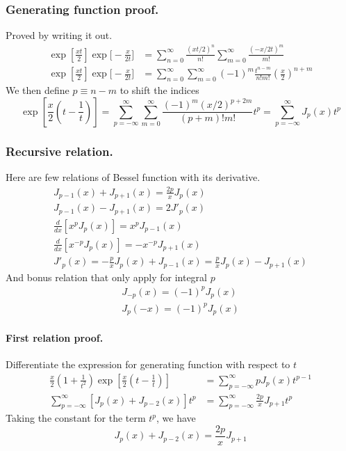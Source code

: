 \documentclass[../../../main.tex]{subfiles}
\begin{document}
\subsubsection{Generating function proof.} Proved by writing it out.
\begin{align*}
    \exp\left[\frac{xt}{2}\right] \exp\bigg[-\frac{x}{2t}\bigg] & =\sum_{n=0}^{\infty}\frac{(xt/2)^n}{n!}\sum_{m=0}^{\infty} \frac{(-x/2t)^m}{m!}                 \\
    \exp\left[\frac{xt}{2}\right] \exp\bigg[-\frac{x}{2t}\bigg] & =\sum_{n=0}^{\infty}\sum_{m=0}^{\infty}(-1)^m\frac{t^{n-m}}{n!m!}\left(\frac{x}{2}\right)^{n+m}
\end{align*}
We then define $p\equiv n-m$ to shift the indices
\begin{equation*}
    \exp\left[\frac{x}{2}\left(t-\frac{1}{t}\right)\right]= \sum_{p=-\infty}^{\infty}\sum_{m=0}^{\infty}\frac{(-1)^m(x/2)^{p+2m}}{(p+m)!m!}t^p=\sum_{p=-\infty}^{\infty}J_p(x)t^p
\end{equation*}

\subsubsection{Recursive relation.} Here are few relations of Bessel function with its derivative.
\begin{gather*}
    J_{p-1}(x)+J_{p+1}(x)=\frac{2p}{x}J_p(x)\\
    J_{p-1}(x)- J_{p+1}(x)=2J'_p(x)\\
    \frac{d}{dx}[x^pJ_p(x)]=x^pJ_{p-1}(x)\\
    \frac{d}{dx}[x^{-p}J_p(x)]=-x^{-p}J_{p+1}(x)\\
    J'_p(x)=-\frac{p}{x}J_p(x)+J_{p-1}(x)=\frac{p}{x}J_p(x)-J_{p+1}(x)
\end{gather*}
And bonus relation that only apply for integral $p$
\begin{gather*}
    J_{-p}(x)=(-1)^pJ_p(x)\\
    J_p(-x)=(-1)^pJ_p(x)
\end{gather*}


\paragraph*{First relation proof.} Differentiate the expression for generating function with respect to $t$
\begin{align*}
    \frac{x}{2}\left(1+\frac{1}{t^2}\right)\exp\left[\frac{x}{2}\left(t-\frac{1}{t}\right)\right] & =\sum_{p=-\infty}^{\infty}pJ_p(x)t^{p-1}            \\
    \sum_{p=-\infty}^{\infty}\left[J_p(x)+J_{p-2}(x)\right]t^p                                    & = \sum_{p=-\infty}^{\infty}\frac{2p}{x}J_{p+1}t^{p}
\end{align*}
Taking the constant for the term $t^p$, we have
\begin{equation*}
    J_p(x)+J_{p-2}(x)=\frac{2p}{x}J_{p+1}
\end{equation*}
\end{document}
